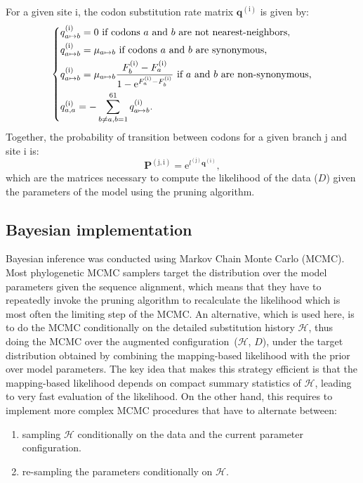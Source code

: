 \documentclass{article}
\newcommand{\BiDimArray}[1]{\bm{#1}}
\newcommand{\e}{\text{e}}
\newcommand{\submatrix}{q}
\newcommand{\Submatrix}{\BiDimArray{\submatrix}}
\newcommand{\probmatrix}{P}
\newcommand{\Probmatrix}{\BiDimArray{\probmatrix}}
\newcommand{\fit}{F}
\newcommand{\ci}{{a}}
\newcommand{\cj}{{b}}
\newcommand{\itoj}{\ci \mapsto \cj}
\newcommand{\fiti}{\fit_{\ci}}
\newcommand{\fitj}{\fit_{\cj}}
\newcommand{\branch}{\text{j}}
\newcommand{\branchexp}{^{(\branch)}}
\newcommand{\branchlength}{l}
\newcommand{\data}{D}
\newcommand{\site}{\text{i}}
\newcommand{\siteexp}{^{(\site)}}
\newcommand{\branchsiteexp}{^{(\branch, \site)}}
\newcommand{\subhistory}{\mathcal{H}}
\begin{document}
    For a given site $\site$, the {codon} {substitution} rate matrix $\Submatrix\siteexp$ is given by:
    \begin{equation}
        \label{eq:subrates}
        \begin{dcases}
            \submatrix\siteexp_{\itoj} = 0\text{ if codons $\ci$ and $\cj$ are not nearest-neighbors,} \\
            \submatrix\siteexp_{\itoj} = \mu_{\itoj}\text{ if codons $\ci$ and $\cj$ are {synonymous},} \\
            \submatrix\siteexp_{\itoj} = \mu_{\itoj} \dfrac{ \fitj\siteexp - \fiti\siteexp}{{1 - \e^{\fiti\siteexp - \fitj\siteexp} }} \text{ if $\ci$ and $\cj$ are non-synonymous,}\\
            \submatrix\siteexp_{\ci, \ci} = - \sum\limits_{ \cj \neq \ci, \cj=1}^{61} \submatrix\siteexp_{\itoj}.
        \end{dcases}
    \end{equation}
    Together, the probability of transition between codons for a given branch $\branch$ and site $\site$ is:
    \begin{equation}
        \label{eq:Probmatrix}
        \Probmatrix\branchsiteexp = \e^{\branchlength\branchexp \Submatrix\siteexp},
    \end{equation}
    which are the matrices necessary to compute the {likelihood} of the data ($\data$) given the parameters of the model using the pruning algorithm.

    \subsection{Bayesian implementation}
    \label{sec:Bayesian}
    Bayesian inference was conducted using Markov Chain Monte Carlo (MCMC).
    Most phylogenetic {MCMC} samplers target the distribution over the model parameters given the sequence alignment, which means that they have to repeatedly invoke the pruning algorithm to recalculate the {likelihood} which is most often the limiting step of the {MCMC}.
    An alternative, which is used here, is to do the {MCMC} conditionally on the detailed {substitution} history $\subhistory$, thus doing the {MCMC} over the augmented configuration~($\subhistory$, $\data$), under the target distribution obtained by combining the mapping-based {likelihood} with the {prior} over model parameters.
    The key idea that makes this strategy efficient is that the mapping-based {likelihood} depends on compact summary statistics of $\subhistory$, leading to very fast evaluation of the {likelihood}.
    On the other hand, this requires to implement more complex {MCMC} procedures that have to alternate between:
    \begin{enumerate}
        \item sampling $\subhistory$ conditionally on the data and the current parameter configuration.
        \item re-sampling the parameters conditionally on $\subhistory$.
    \end{enumerate}
\end{document}
